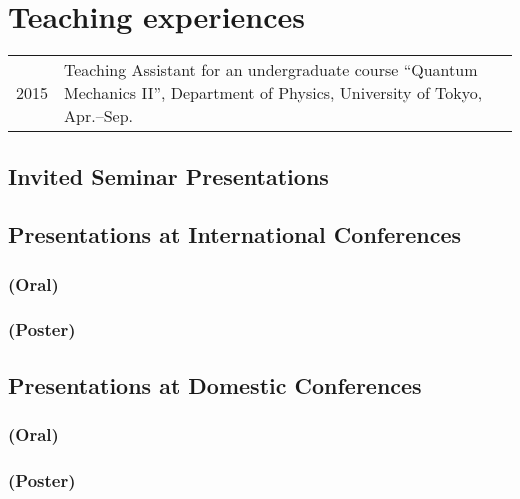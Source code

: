 \documentclass[12pt]{article}
\begin{document}
\section*{Teaching experiences}
\begin{table}[H]
  \begin{tabular}{lp{6in}}
    2015 & Teaching Assistant for an undergraduate course ``Quantum Mechanics II'', Department of Physics, University of Tokyo, Apr.--Sep.
  \end{tabular}
\end{table}



\nocite{*}

\subsection*{Invited Seminar Presentations}

\subsection*{Presentations at International Conferences}
\subsubsection*{(Oral)}

\subsubsection*{(Poster)}

\subsection*{Presentations at Domestic Conferences}
\subsubsection*{(Oral)}

\subsubsection*{(Poster)}

\end{document}
